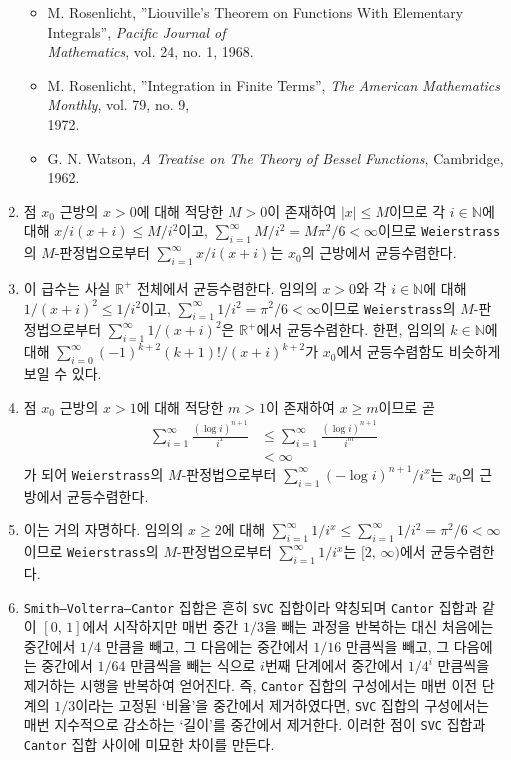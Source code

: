 \begin{enumerate}[label = \textsf{\textbf{\arabic*}}]
\begin{itemize}
        \item M. Rosenlicht, ''Liouville's Theorem on Functions With Elementary Integrals'', \textit{Pacific Journal of\\Mathematics}, vol. 24, no. 1, 1968.
        \item M. Rosenlicht, ''Integration in Finite Terms'', \textit{The American Mathematics Monthly}, vol. 79, no. 9,\\1972.
        \item G. N. Watson, \textit{A Treatise on The Theory of Bessel Functions}, Cambridge, 1962.
    \end{itemize}
    \item 점 $x_0$ 근방의 $x>0$에 대해 적당한 $M>0$이 존재하여 $|x|\leq M$이므로 각 $i\in\mathbb{N}$에 대해 $x/i(x+i)\leq M/i^2$이고, $\sum_{i=1}^\infty M/i^2=M\pi^2/6<\infty$이므로 \texttt{Weierstrass}의 $M$-판정법으로부터 $\sum_{i=1}^\infty x/i(x+i)$는 $x_0$의 근방에서 균등수렴한다.
    \item 이 급수는 사실 $\mathbb{R}^+$ 전체에서 균등수렴한다. 임의의 $x>0$와 각 $i\in\mathbb{N}$에 대해 $1/(x+i)^2\leq1/i^2$이고, $\sum_{i=1}^\infty 1/i^2=\pi^2/6<\infty$이므로 \texttt{Weierstrass}의 $M$-판정법으로부터 $\sum_{i=1}^\infty1/(x+i)^2$은 $\mathbb{R}^+$에서 균등수렴한다. 한편, 임의의 $k\in\mathbb{N}$에 대해 $\sum_{i=0}^\infty(-1)^{k+2}(k+1)!/(x+i)^{k+2}$가 $x_0$에서 균등수렴함도 비슷하게 보일 수 있다.
    \item 점 $x_0$ 근방의 $x>1$에 대해 적당한 $m>1$이 존재하여 $x\geq m$이므로 곧
    \begin{align*}
        \sum_{i=1}^\infty\frac{(\log i)^{n+1}}{i^x}&\leq\sum_{i=1}^\infty\frac{(\log i)^{n+1}}{i^m}\\
        &<\infty
    \end{align*}
    가 되어 \texttt{Weierstrass}의 $M$-판정법으로부터 $\sum_{i=1}^\infty(-\log i)^{n+1}/i^x$는 $x_0$의 근방에서 균등수렴한다.
    \item 이는 거의 자명하다. 임의의 $x\geq2$에 대해 $\sum_{i=1}^\infty1/i^x\leq\sum_{i=1}^\infty1/i^2=\pi^2/6<\infty$이므로 \texttt{Weierstrass}의 $M$-판정법으로부터 $\sum_{i=1}^\infty1/i^x$는 $[2,\,\infty)$에서 균등수렴한다.
    \item \texttt{Smith–Volterra–Cantor} 집합은 흔히 \texttt{SVC} 집합이라 약칭되며 \texttt{Cantor} 집합과 같이 $[0,\,1]$에서 시작하지만 매번 중간 $1/3$을 빼는 과정을 반복하는 대신 처음에는 중간에서 $1/4$ 만큼을 빼고, 그 다음에는 중간에서 $1/16$ 만큼씩을 빼고, 그 다음에는 중간에서 $1/64$ 만큼씩을 빼는 식으로 $i$번째 단계에서 중간에서 $1/4^i$ 만큼씩을 제거하는 시행을 반복하여 얻어진다. 즉, \texttt{Cantor} 집합의 구성에서는 매번 이전 단계의 $1/3$이라는 고정된 `비율'을 중간에서 제거하였다면, \texttt{SVC} 집합의 구성에서는 매번 지수적으로 감소하는 `길이'를 중간에서 제거한다. 이러한 점이 \texttt{SVC} 집합과 \texttt{Cantor} 집합 사이에 미묘한 차이를 만든다.


\end{enumerate}
